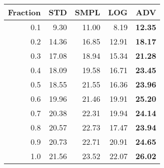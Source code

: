 \documentclass{standalone}
\begin{document}
\begin{tabular}{r|rrrr}
      \toprule
      Fraction & STD & SMPL & LOG & ADV\\
      \midrule
      0.1 & 9.30 & 11.00 & 8.19 & \textbf{12.35}\\
  0.2 & 14.36 & 16.85 & 12.91 & \textbf{18.17}\\
  0.3 & 17.08 & 18.94 & 15.34 & \textbf{21.28}\\
  0.4 & 18.09 & 19.58 & 16.71 & \textbf{23.45}\\
  0.5 & 18.55 & 21.55 & 16.36 & \textbf{23.96}\\
  0.6 & 19.96 & 21.46 & 19.91 & \textbf{25.20}\\
  0.7 & 20.38 & 22.31 & 19.94 & \textbf{24.14}\\
  0.8 & 20.57 & 22.73 & 17.47 & \textbf{23.94}\\
  0.9 & 20.73 & 22.71 & 20.91 & \textbf{24.65}\\
  1.0 & 21.56 & 23.52 & 22.07 & \textbf{26.02}\\
  \bottomrule
\end{tabular}
\end{document}

